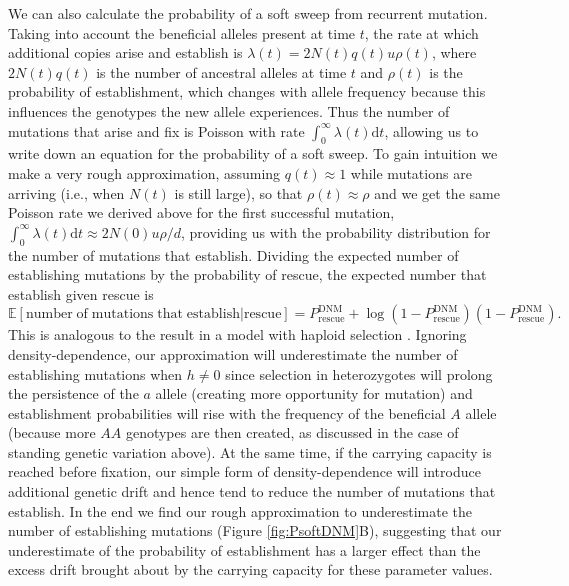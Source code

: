 \documentclass[]{article}
\begin{document}
We can also calculate the probability of a soft sweep from recurrent mutation.
Taking into account the beneficial alleles present at time $t$, the rate at which additional copies arise and establish is $\lambda(t) = 2 N(t) q(t) u \rho(t)$, where $2 N(t) q(t)$ is the number of ancestral alleles at time $t$ and $\rho(t)$ is the probability of establishment, which changes with allele frequency because this influences the genotypes the new allele experiences.
Thus the number of mutations that arise and fix is Poisson with rate $\int_0^\infty \lambda(t) \mathrm{d} t$, allowing us to write down an equation for the probability of a soft sweep. 
To gain intuition we make a very rough approximation, assuming $q(t)\approx1$ while mutations are arriving (i.e., when $N(t)$ is still large), so that $\rho(t)\approx\rho$ and we get the same Poisson rate we derived above for the first successful mutation, $\int_0^\infty \lambda(t) \mathrm{d} t \approx 2N(0) u \rho/d$, providing us with the probability distribution for the number of mutations that establish.
Dividing the expected number of establishing mutations by the probability of rescue, the expected number that establish given rescue is
\begin{equation}\label{eq:ENestDNM}
\mathbb{E}[\mathrm{number\; of\; mutations\; that\; establish}|\mathrm{rescue}] = P_\mathrm{rescue}^\mathrm{DNM} + \log(1-P_\mathrm{rescue}^\mathrm{DNM})(1-P_\mathrm{rescue}^\mathrm{DNM}).
\end{equation}
This is analogous to the result in a model with haploid selection \citep[c.f., equation 7 in][]{wilson2017soft}.  
Ignoring density-dependence, our approximation will underestimate the number of establishing mutations when $h\neq0$ since selection in heterozygotes will prolong the persistence of the $a$ allele (creating more opportunity for mutation) and establishment probabilities will rise with the frequency of the beneficial $A$ allele (because more $AA$ genotypes are then created, as discussed in the case of standing genetic variation above).
At the same time, if the carrying capacity is reached before fixation, our simple form of density-dependence will introduce additional genetic drift and hence tend to reduce the number of mutations that establish.
In the end we find our rough approximation to underestimate the number of establishing mutations (Figure \ref{fig:PsoftDNM}B), suggesting that our underestimate of the probability of establishment has a larger effect than the excess drift brought about by the carrying capacity for these parameter values.
\end{document}
